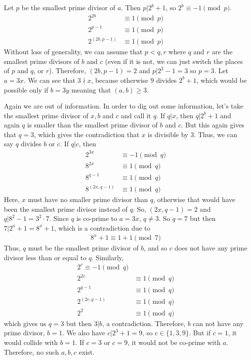\documentclass[problems.tex]{subfile}
\begin{document}
	\begin{solution}
		Let $p$ be the smallest prime divisor of $a$. Then $p|2^b+1$, so $2^b\equiv-1\pmod p$.
			\begin{align*}
				2^{2b} & \equiv1\pmod p\\
				2^{p-1}& \equiv1\pmod p\\
				2^{(2b,p-1)}&\equiv1\pmod p
			\end{align*}
		Without loss of generality, we can assume that $p<q,r$ where $q$ and $r$  are the smallest prime divisors of $b$ and $c$ (even if it is not, we can just switch the places of $p$ and $q$, or $r$). Therefore, $(2b,p-1)=2$ and $p|2^2-1=3$ so $p=3$. Let $a=3x$. We can see that $3\nmid x$, because otherwise $9$ divides $2^b+1$, which would be possible only if $b=3y$ meaning that $(a,b)\geq3$.
		
		Again we are out of information. In order to dig out some information, let's take the smallest prime divisor of $x,b$ and $c$ and call it $q$. If $q|x$, then $q|2^b+1$ and again $q$ is smaller than the smallest prime divisor of $b$ and $c$. But this again gives that $q=3$, which gives the contradiction that $x$ is divisible by $3$. Thus, we can say $q$ divides $b$ or $c$. If $q|c$, then
			\begin{align*}
				2^{3x} & \equiv-1\pmod q\\
				8^{2x} & \equiv1\pmod q\\
				8^{q-1}& \equiv1\pmod q\\
				8^{(2x,q-1)}&\equiv1\pmod q
			\end{align*}
		Here, $x$ must have no smaller prime divisor than $q$, otherwise that would have been the smallest prime divisor instead of $q$. So, $(2x,q-1)=2$ and $q|8^2-1=3^2\cdot7$. Since $q$ is co-prime to $a=3x$, $q\neq3$. So $q=7$ but then $7|2^a+1=8^x+1$, which is a contradiction due to
			\begin{align*}
				8^x+1\equiv1+1\pmod7 
			\end{align*}
		Thus, $q$ must be the smallest prime divisor of $b$, and so $c$ does not have any prime divisor less than or equal to $q$. Similarly,
			\begin{align*}
				2^c\equiv-1\pmod q\\
				2^{2c}&\equiv1\pmod q\\
				2^{q-1}&\equiv1\pmod q\\
				2^{(2c,q-1)}&\equiv1\pmod q\\
				2^2&\equiv1\pmod q
			\end{align*}
		which gives us $q=3$ but then $3|b$, a contradiction. Therefore, $b$ can not have any prime divisor, $b=1$. We also have $c|2^3+1=9$, so $c\in\{1,3,9\}$. But if $c=1$, it would collide with $b=1$. If $c=3$ or $c=9$, it would not be co-prime with $a$. Therefore, no such $a,b,c$ exist.
	\end{solution}
	
\end{document}
